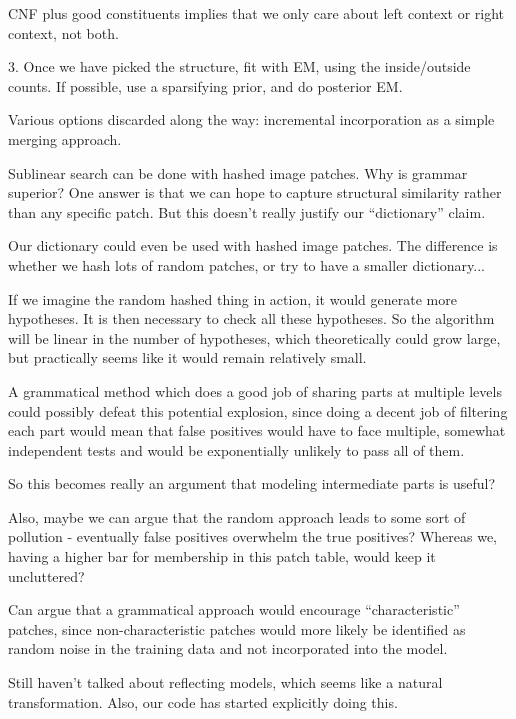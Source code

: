 \documentclass{article}
\begin{document}
CNF plus good constituents implies that we only care about left
context or right context, not both.

3. Once we have picked the structure, fit with EM, using the
inside/outside counts. If possible, use a sparsifying prior, and do
posterior EM.

Various options discarded along the way: incremental incorporation as
a simple merging approach.

\item Sublinear search can be done with hashed image patches. Why is
  grammar superior?  One answer is that we can hope to capture
  structural similarity rather than any specific patch. But this
  doesn't really justify our ``dictionary'' claim.

  Our dictionary could even be used with hashed image patches. The
  difference is whether we hash lots of random patches, or try to have
  a smaller dictionary...

  If we imagine the random hashed thing in action, it would generate
  more hypotheses. It is then necessary to check all these
  hypotheses. So the algorithm will be linear in the number of
  hypotheses, which theoretically could grow large, but practically
  seems like it would remain relatively small.

  A grammatical method which does a good job of sharing parts at
  multiple levels could possibly defeat this potential explosion,
  since doing a decent job of filtering each part would mean that
  false positives would have to face multiple, somewhat independent
  tests and would be exponentially unlikely to pass all of them.

  So this becomes really an argument that modeling intermediate parts
  is useful?

  Also, maybe we can argue that the random approach leads to some sort
  of pollution - eventually false positives overwhelm the true
  positives? Whereas we, having a higher bar for membership in this
  patch table, would keep it uncluttered?

  Can argue that a grammatical approach would encourage
  ``characteristic'' patches, since non-characteristic patches would
  more likely be identified as random noise in the training data and
  not incorporated into the model.

\item Still haven't talked about reflecting models, which seems like a
  natural transformation. Also, our code has started explicitly doing
  this.
\end{document}
